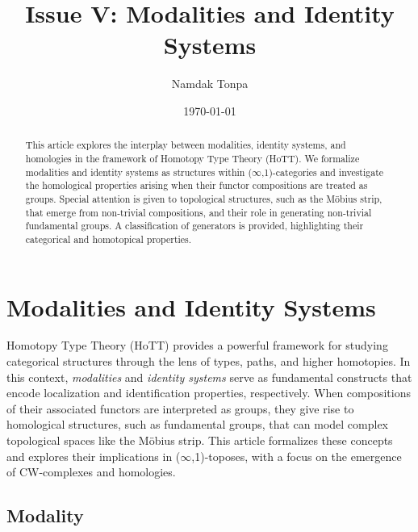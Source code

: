 \documentclass{article}
\begin{document}
\title{Issue V: Modalities and Identity Systems}
\author{Namdak Tonpa}
\date{\today}

\maketitle

\begin{abstract}
This article explores the interplay between modalities, identity systems, and homologies
in the framework of Homotopy Type Theory (HoTT). We formalize modalities and identity
systems as structures within ($\infty$,1)-categories and investigate the homological properties arising when their functor compositions are treated as groups. Special attention is given to topological structures, such as the Möbius strip, that emerge from non-trivial compositions, and their role in generating non-trivial fundamental groups. A classification of generators is provided, highlighting their categorical and homotopical properties.
\end{abstract}

\ifincludeTOC
  \tableofcontents
\fi

\section{Modalities and Identity Systems}

Homotopy Type Theory (HoTT) provides a powerful framework for studying
categorical structures through the lens of types, paths, and higher
homotopies. In this context, \emph{modalities} and \emph{identity systems}
serve as fundamental constructs that encode localization and identification
properties, respectively. When compositions of their associated functors
are interpreted as groups, they give rise to homological structures, such
as fundamental groups, that can model complex topological spaces like the
Möbius strip. This article formalizes these concepts and explores their
implications in ($\infty$,1)-toposes, with a focus on the emergence of CW-complexes and homologies.

\newpage
\subsection{Modality}
\end{document}
